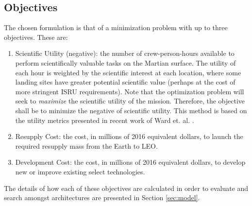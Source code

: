 \documentclass[]{aiaa-pretty}
\begin{document}
\subsection{Objectives}
The chosen formulation is that of a minimization problem with up to three objectives. These are: 
\begin{enumerate}
\item Scientific Utility (negative): the number of crew-person-hours available to perform scientifically valuable tasks on the Martian surface. The utility of each hour is weighted by the scientific interest at each location, where some landing sites have greater potential scientific value (perhaps at the cost of more stringent ISRU requirements). Note that the optimization problem will seek to \textit{maximize} the scientific utility of the mission. Therefore, the objective shall be to minimize the negative of scientific utility. This method is based on the utility metrics presented in recent work of Ward et. al. \cite{ward2015}.
\item Resupply Cost: the cost, in millions of 2016 equivalent dollars, to launch the required resupply mass from the Earth to LEO.
\item Development Cost: the cost, in millions of 2016 equivalent dollars, to develop new or improve existing select technologies.
\end{enumerate}
The details of how each of these objectives are calculated in order to evaluate and search amongst architectures are presented in Section \ref{sec:model}. 
\end{document}
